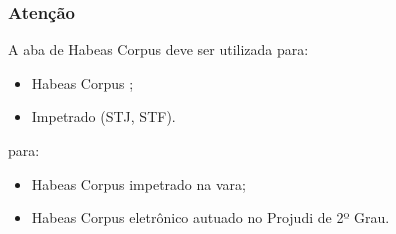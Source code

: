 \documentclass[letterpaper,10pt,brazil]{sphinxmanual}
\begin{document}
\subsubsection{Atenção}
\label{\detokenize{projud_59_juntadahabeascorpus:atencao}}
\sphinxAtStartPar
A aba de Habeas Corpus deve ser utilizada  para:
\begin{itemize}
\item {} 
\sphinxAtStartPar
Habeas Corpus ;

\item {} 
\sphinxAtStartPar
Impetrado  (STJ, STF).

\end{itemize}

\sphinxAtStartPar
{} para:
\begin{itemize}
\item {} 
\sphinxAtStartPar
Habeas Corpus impetrado na vara;

\item {} 
\sphinxAtStartPar
Habeas Corpus eletrônico autuado no Projudi de 2º Grau.

\end{itemize}
\end{document}
